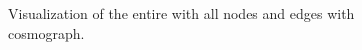 \documentclass[pdftex,12pt,a4paper]{report}
\begin{document}
\begin{figure}[!ht]
\begin{center}
	\caption{Visualization of the entire with all nodes and edges with cosmograph\cite{cosmograph}.}
	\label{complete_network}
\end{center}
\end{figure}
\end{document}
